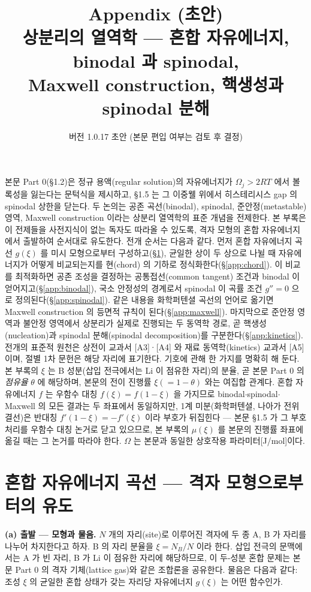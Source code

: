 \documentclass[11pt,a4paper]{article}
\title{\textbf{\LARGE Appendix (초안)}\\[0.35em]\Large 상분리의 열역학 --- 혼합 자유에너지, binodal 과 spinodal,\\ Maxwell construction, 핵생성과 spinodal 분해}
\author{}
\date{\normalsize 버전 1.0.17 초안 \quad(본문 편입 여부는 검토 후 결정)}
\begin{document}
\maketitle

본문 Part 0(\S1.2)은 정규 용액(regular solution)의 자유에너지가 $\Omega_j>2RT$ 에서 볼록성을 잃는다는
문턱식을 제시하고, \S1.5 는 그 이중웰 위에서 히스테리시스 gap 의 spinodal 상한을 닫는다. 두 논의는
공존 곡선(binodal), spinodal, 준안정(metastable) 영역, Maxwell construction 이라는 상분리 열역학의
표준 개념을 전제한다. 본 부록은 이 전제들을 사전지식이 없는 독자도 따라올 수 있도록, 격자 모형의
혼합 자유에너지에서 출발하여 순서대로 유도한다. 전개 순서는 다음과 같다. 먼저 혼합 자유에너지
곡선 $g(\xi)$ 를 미시 모형으로부터 구성하고(\S\ref{app:mixfe}), 균일한 상이 두 상으로 나뉠 때
자유에너지가 어떻게 비교되는지를 현(chord) 의 기하로 정식화한다(\S\ref{app:chord}). 이 비교를
최적화하면 공존 조성을 결정하는 공통접선(common tangent) 조건과 binodal 이 얻어지고(\S\ref{app:binodal}),
국소 안정성의 경계로서 spinodal 이 곡률 조건 $g''=0$ 으로 정의된다(\S\ref{app:spinodal}).
같은 내용을 화학퍼텐셜 곡선의 언어로 옮기면 Maxwell construction 의 등면적 규칙이
된다(\S\ref{app:maxwell}). 마지막으로 준안정 영역과 불안정 영역에서 상분리가 실제로 진행되는 두
동역학 경로, 곧 핵생성(nucleation)과 spinodal 분해(spinodal decomposition)를
구분한다(\S\ref{app:kinetics}). 전개의 표준적 원천은 상전이 교과서 [A3]·[A4] 와 재료 동역학(kinetics) 교과서
[A5] 이며, 절별 1차 문헌은 해당 자리에 표기한다. 기호에 관해 한 가지를 명확히 해 둔다. 본 부록의 $\xi$ 는 B 성분(삽입
전극에서는 Li 이 점유한 자리)의 분율, 곧 본문 Part 0 의 \emph{점유율} $\theta$ 에 해당하며, 본문의 전이
진행률 $\xi(=1-\theta)$ 와는 여집합 관계다. 혼합 자유에너지 $f$ 는 우함수 대칭 $f(\xi)=f(1-\xi)$ 을
가지므로 binodal$\cdot$spinodal$\cdot$Maxwell 의 모든 결과는 두 좌표에서 동일하지만, 1계
미분(화학퍼텐셜, 나아가 전위 결선)은 반대칭 $f'(1-\xi)=-f'(\xi)$ 이라 부호가 뒤집힌다 --- 본문
\S1.5 가 그 부호 처리를 우함수 대칭 논거로 닫고 있으므로, 본 부록의 $\mu(\xi)$ 를 본문의 진행률 좌표에
옮길 때는 그 논거를 따라야 한다. $\Omega$ 는 본문과 동일한 상호작용 파라미터[J/mol]이다.

\section{혼합 자유에너지 곡선 --- 격자 모형으로부터의 유도}\label{app:mixfe}

\textbf{(a) 출발 --- 모형과 물음.} $N$ 개의 자리(site)로 이루어진 격자에 두 종 A, B 가 자리를 나누어
차지한다고 하자. B 의 자리 분율을 $\xi=N_B/N$ 이라 한다. 삽입 전극의 문맥에서는 A 가 빈 자리, B 가
Li 이 점유한 자리에 해당하므로, 이 두-성분 혼합 문제는 본문 Part 0 의 격자 기체(lattice gas)와 같은
조합론을 공유한다. 물음은 다음과 같다: 조성 $\xi$ 의 균일한 혼합 상태가 갖는 자리당 자유에너지
$g(\xi)$ 는 어떤 함수인가.
\end{document}
